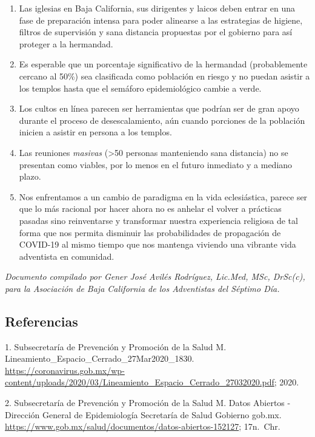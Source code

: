 \documentclass[]{article}
\providecommand{\tightlist}{%
  \setlength{\itemsep}{0pt}\setlength{\parskip}{0pt}}
\begin{document}
\begin{enumerate}
\def\labelenumi{\arabic{enumi}.}
\tightlist
\item
  Las iglesias en Baja California, sus dirigentes y laicos deben entrar
  en una fase de preparación intensa para poder alinearse a las
  estrategias de higiene, filtros de supervisión y sana distancia
  propuestas por el gobierno para así proteger a la hermandad.
\item
  Es esperable que un porcentaje significativo de la hermandad
  (probablemente cercano al 50\%) sea clasificada como población en
  riesgo y no puedan asistir a los templos hasta que el semáforo
  epidemiológico cambie a verde.
\item
  Los cultos en línea parecen ser herramientas que podrían ser de gran
  apoyo durante el proceso de desescalamiento, aún cuando porciones de
  la población inicien a asistir en persona a los templos.
\item
  Las reuniones \emph{masivas} (\textgreater{}50 personas manteniendo
  sana distancia) no se presentan como viables, por lo menos en el
  futuro inmediato y a mediano plazo.
\item
  Nos enfrentamos a un cambio de paradigma en la vida eclesiástica,
  parece ser que lo más racional por hacer ahora no es anhelar el volver
  a prácticas pasadas sino reinventarse y transformar nuestra
  experiencia religiosa de tal forma que nos permita disminuir las
  probabilidades de propagación de COVID-19 al mismo tiempo que nos
  mantenga viviendo una vibrante vida adventista en comunidad.
\end{enumerate}

\emph{Documento compilado por Gener José Avilés Rodríguez, Lic.Med, MSc,
DrSc(c), para la Asociación de Baja California de los Adventistas del
Séptimo Día.}

\subsection*{Referencias}\label{referencias}

\hypertarget{refs}{}
\hypertarget{ref-Lineamie24:online}{}
1. Subsecretaría de Prevención y Promoción de la Salud M.
Lineamiento\_Espacio\_Cerrado\_27Mar2020\_1830.
\url{https://coronavirus.gob.mx/wp-content/uploads/2020/03/Lineamiento_Espacio_Cerrado_27032020.pdf};
2020.

\hypertarget{ref-DatosAbi46:online}{}
2. Subsecretaría de Prevención y Promoción de la Salud M. Datos Abiertos
- Dirección General de Epidemiología \textbar{} Secretaría de Salud
\textbar{} Gobierno \textbar{} gob.mx.
\url{https://www.gob.mx/salud/documentos/datos-abiertos-152127};
17n.~Chr.
\end{document}
